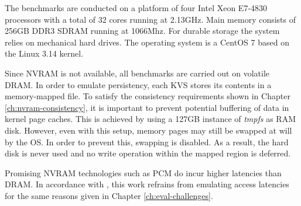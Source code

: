 

The benchmarks are conducted on a platform of four Intel Xeon E7-4830 processors
with a total of 32 cores running at 2.13GHz. Main memory consists of 256GB DDR3
SDRAM running at 1066Mhz. For durable storage the system relies on mechanical
hard drives. The operating system is a CentOS 7 based on the Linux 3.14 kernel.

Since NVRAM is not available, all benchmarks are carried out on volatile DRAM.
In order to emulate persistency, each KVS stores its contents in a memory-mapped
file. To satisfy the consistency requirements shown in Chapter
\ref{ch:nvram-consistency}, it is important to prevent potential buffering of
data in kernel page caches. This is achieved by using a 127GB instance of
\emph{tmpfs} as RAM disk. However, even with this setup, memory pages may still
be swapped at will by the OS. In order to prevent this, swapping is disabled. As
a result, the hard disk is never used and no write operation within the mapped
region is deferred.


Promising NVRAM technologies such as PCM do incur higher latencies than DRAM. In
accordance with \cite{bailey2013exploring, zhou2016nvht}, this work refrains
from emulating access latencies for the same reasons given in Chapter
\ref{ch:eval-challenges}.
